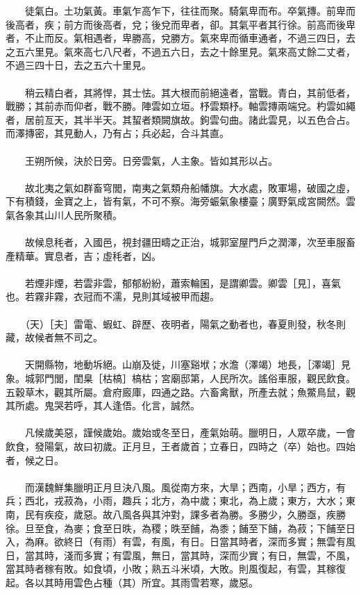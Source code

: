 　　徒氣白。土功氣黃。車氣乍高乍下，往往而聚。騎氣卑而布。卒氣摶。前卑而後高者，疾；前方而後高者，兌；後兌而卑者，卻。其氣平者其行徐。前高而後卑者，不止而反。氣相遇者，卑勝高，兌勝方。氣來卑而循車通者，不過三四日，去之五六里見。氣來高七八尺者，不過五六日，去之十餘里見。氣來高丈餘二丈者，不過三四十日，去之五六十里見。
\\\\
　　稍云精白者，其將悍，其士怯。其大根而前絕遠者，當戰。青白，其前低者，戰勝；其前赤而仰者，戰不勝。陣雲如立垣。杼雲類杼。軸雲摶兩端兌。杓雲如繩者，居前亙天，其半半天。其蛪者類闕旗故。鉤雲句曲。諸此雲見，以五色合占。而澤摶密，其見動人，乃有占；兵必起，合斗其直。
\\\\
　　王朔所候，決於日旁。日旁雲氣，人主象。皆如其形以占。
\\\\
　　故北夷之氣如群畜穹閭，南夷之氣類舟船幡旗。大水處，敗軍場，破國之虛，下有積錢，金寶之上，皆有氣，不可不察。海旁蜄氣象樓臺；廣野氣成宮闕然。雲氣各象其山川人民所聚積。
\\\\
　　故候息秏者，入國邑，視封疆田疇之正治，城郭室屋門戶之潤澤，次至車服畜產精華。實息者，吉；虛秏者，凶。
\\\\
　　若煙非煙，若雲非雲，郁郁紛紛，蕭索輪囷，是謂卿雲。卿雲［見］，喜氣也。若霧非霧，衣冠而不濡，見則其域被甲而趨。
\\\\
　　（天）［夫］雷電、蝦虹、辟歷、夜明者，陽氣之動者也，春夏則發，秋冬則藏，故候者無不司之。
\\\\
　　天開縣物，地動坼絕。山崩及徙，川塞谿垘；水澹（澤竭）地長，［澤竭］見象。城郭門閭，閨臬［枯槁］槁枯；宮廟邸第，人民所次。謠俗車服，觀民飲食。五穀草木，觀其所屬。倉府廄庫，四通之路。六畜禽獸，所產去就；魚鱉鳥鼠，觀其所處。鬼哭若呼，其人逢俉。化言，誠然。
\\\\
　　凡候歲美惡，謹候歲始。歲始或冬至日，產氣始萌。臘明日，人眾卒歲，一會飲食，發陽氣，故曰初歲。正月旦，王者歲首；立春日，四時之（卒）始也。四始者，候之日。
\\\\
　　而漢魏鮮集臘明正月旦決八風。風從南方來，大旱；西南，小旱；西方，有兵；西北，戎菽為，小雨，趣兵；北方，為中歲；東北，為上歲；東方，大水；東南，民有疾疫，歲惡。故八風各與其沖對，課多者為勝。多勝少，久勝亟，疾勝徐。旦至食，為麥；食至日昳，為稷；昳至餔，為黍；餔至下餔，為菽；下餔至日入，為麻。欲終日（有雨）有雲，有風，有日。日當其時者，深而多實；無雲有風日，當其時，淺而多實；有雲風，無日，當其時，深而少實；有日，無雲，不風，當其時者稼有敗。如食頃，小敗；熟五斗米頃，大敗。則風復起，有雲，其稼復起。各以其時用雲色占種（其）所宜。其雨雪若寒，歲惡。
